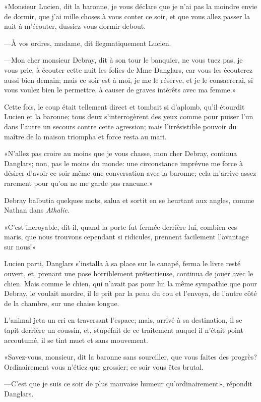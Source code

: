 «Monsieur Lucien, dit la baronne, je vous déclare que je n'ai pas la moindre envie de dormir, que j'ai mille choses à vous conter ce soir, et que vous allez passer la nuit à m'écouter, dussiez-vous dormir debout. 

—À vos ordres, madame, dit flegmatiquement Lucien. 

—Mon cher monsieur Debray, dit à son tour le banquier, ne vous tuez pas, je vous prie, à écouter cette nuit les folies de Mme Danglars, car vous les écouterez aussi bien demain; mais ce soir est à moi, je me le réserve, et je le consacrerai, si vous voulez bien le permettre, à causer de graves intérêts avec ma femme.» 

Cette fois, le coup était tellement direct et tombait si d'aplomb, qu'il étourdit Lucien et la baronne; tous deux s'interrogèrent des yeux comme pour puiser l'un dans l'autre un secours contre cette agression; mais l'irrésistible pouvoir du maître de la maison triompha et force resta au mari. 

«N'allez pas croire au moins que je vous chasse, mon cher Debray, continua Danglars; non, pas le moins du monde: une circonstance imprévue me force à désirer d'avoir ce soir même une conversation avec la baronne; cela m'arrive assez rarement pour qu'on ne me garde pas rancune.» 

Debray balbutia quelques mots, salua et sortit en se heurtant aux angles, comme Nathan dans \textit{Athalie}. 

«C'est incroyable, dit-il, quand la porte fut fermée derrière lui, combien ces maris, que nous trouvons cependant si ridicules, prennent facilement l'avantage sur nous!» 

Lucien parti, Danglars s'installa à sa place sur le canapé, ferma le livre resté ouvert, et, prenant une pose horriblement prétentieuse, continua de jouer avec le chien. Mais comme le chien, qui n'avait pas pour lui la même sympathie que pour Debray, le voulait mordre, il le prit par la peau du cou et l'envoya, de l'autre côté de la chambre, sur une chaise longue. 

L'animal jeta un cri en traversant l'espace; mais, arrivé à sa destination, il se tapit derrière un coussin, et, stupéfait de ce traitement auquel il n'était point accoutumé, il se tint muet et sans mouvement. 

«Savez-vous, monsieur, dit la baronne sans sourciller, que vous faites des progrès? Ordinairement vous n'étiez que grossier; ce soir vous êtes brutal. 

—C'est que je suis ce soir de plus mauvaise humeur qu'ordinairement», répondit Danglars. 

